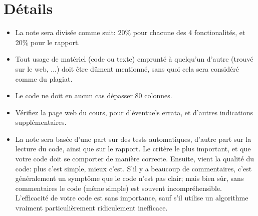 \documentclass{article}
\begin{document}
\section{Détails}

\begin{itemize}
\item La note sera divisée comme suit: 20\% pour chacune des
  4 fonctionalités, et 20\% pour le rapport.
\item Tout usage de matériel (code ou texte) emprunté à quelqu'un d'autre
  (trouvé sur le web, ...) doit être dûment mentionné, sans quoi cela sera
  considéré comme du plagiat.
\item Le code ne doit en aucun cas dépasser 80 colonnes.
\item Vérifiez la page web du cours, pour d'éventuels errata, et d'autres
  indications supplémentaires.
\item La note sera basée d'une part sur des tests automatiques, d'autre part
  sur la lecture du code, ainsi que sur le rapport.  Le critère le plus
  important, et que votre code doit se comporter de manière correcte.
  Ensuite, vient la qualité du code: plus c'est simple, mieux c'est.
  S'il y a beaucoup de commentaires, c'est généralement un symptôme que le
  code n'est pas clair; mais bien sûr, sans commentaires le code (même
  simple) est souvent incompréhensible.  L'efficacité de votre code est sans
  importance, sauf s'il utilise un algorithme vraiment particulièrement
  ridiculement inefficace.
\end{itemize}
\end{document}
